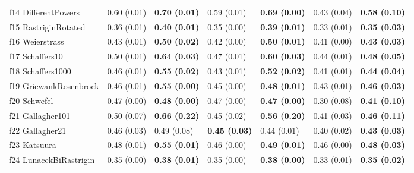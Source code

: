 \begin{table}
\begin{tabular}{lllllll}
f14 DifferentPowers & 0.60 (0.01) & \textbf{0.70 (0.01)} & 0.59 (0.01) & \textbf{0.69 (0.00)} & 0.43 (0.04) & \textbf{0.58 (0.10)} \\
f15 RastriginRotated & 0.36 (0.01) & \textbf{0.40 (0.01)} & 0.35 (0.00) & \textbf{0.39 (0.01)} & 0.33 (0.01) & \textbf{0.35 (0.03)} \\
f16 Weierstrass & 0.43 (0.01) & \textbf{0.50 (0.02)} & 0.42 (0.00) & \textbf{0.50 (0.01)} & 0.41 (0.00) & \textbf{0.43 (0.03)} \\
f17 Schaffers10 & 0.50 (0.01) & \textbf{0.64 (0.03)} & 0.47 (0.01) & \textbf{0.60 (0.03)} & 0.44 (0.01) & \textbf{0.48 (0.05)} \\
f18 Schaffers1000 & 0.46 (0.01) & \textbf{0.55 (0.02)} & 0.43 (0.01) & \textbf{0.52 (0.02)} & 0.41 (0.01) & \textbf{0.44 (0.04)} \\
f19 GriewankRosenbrock & 0.46 (0.01) & \textbf{0.55 (0.00)} & 0.45 (0.00) & \textbf{0.48 (0.01)} & 0.43 (0.01) & \textbf{0.46 (0.03)} \\
f20 Schwefel & 0.47 (0.00) & \textbf{0.48 (0.00)} & 0.47 (0.00) & \textbf{0.47 (0.00)} & 0.30 (0.08) & \textbf{0.41 (0.10)} \\
f21 Gallagher101 & 0.50 (0.07) & \textbf{0.66 (0.22)} & 0.45 (0.02) & \textbf{0.56 (0.20)} & 0.41 (0.03) & \textbf{0.46 (0.11)} \\
f22 Gallagher21 & 0.46 (0.03) & 0.49 (0.08) & \textbf{0.45 (0.03)} & 0.44 (0.01) & 0.40 (0.02) & \textbf{0.43 (0.03)} \\
f23 Katsuura & 0.48 (0.01) & \textbf{0.55 (0.01)} & 0.46 (0.00) & \textbf{0.49 (0.01)} & 0.46 (0.00) & \textbf{0.48 (0.03)} \\
f24 LunacekBiRastrigin & 0.35 (0.00) & \textbf{0.38 (0.01)} & 0.35 (0.00) & \textbf{0.38 (0.00)} & 0.33 (0.01) & \textbf{0.35 (0.02)} \\
\bottomrule
\end{tabular}
\end{table}
